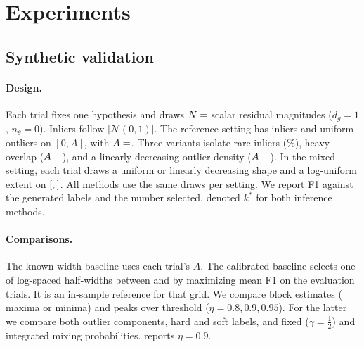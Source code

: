 \documentclass[10pt,twocolumn,letterpaper]{article}
\newcommand{\NN}{\mathcal{N}}               %
\begin{document}
\section{Experiments}
\label{sec:experiments}

\subsection{Synthetic validation}
\label{sec:synthetic}

\paragraph{Design.}
Each trial fixes one hypothesis and draws $N=\syncase{uniform}{N}$
scalar residual magnitudes ($d_g=1$, $n_\theta=0$). Inliers follow
$|\NN(0,1)|$. The reference setting has  inliers
and uniform outliers on $[0,A]$, with $A=\syncase{uniform}{halfwidth}$.
Three variants isolate rare inliers (\%),
heavy overlap ($A=\syncase{uniform_A10}{halfwidth}$), and a linearly
decreasing outlier density ($A=\syncase{linear}{halfwidth}$). In the
mixed setting, each trial draws a uniform or linearly decreasing shape
and a log-uniform extent on
$[\syncase{mixed}{halfwidthmin},\syncase{mixed}{halfwidthmax}]$.
All methods use the same \SynTrials{} draws per setting. We report F1
against the generated labels and the number selected, denoted $k^*$
for both inference methods.

\paragraph{Comparisons.}
The known-width baseline uses each trial's $A$. The calibrated baseline
selects one of \SynGridN{} log-spaced half-widths between \SynGridMin{} and \SynGridMax{}
by maximizing mean F1 on the evaluation trials. It is an in-sample
reference for that grid. We compare block estimates (\SynBlocks{} maxima or
minima) and peaks over threshold ($\eta=0.8,0.9,0.95$). For the latter
we compare both outlier components, hard and soft labels, and fixed
($\gamma=\tfrac12$) and integrated mixing probabilities.
 reports $\eta=0.9$.

\begin{table}[t]
 \centering
 \small
 \caption{Synthetic inlier classification over \SynTrials{} paired trials.
  Each entry gives the number selected (mean $\pm$ standard deviation)
  and mean F1. The true inlier count is , except
  for  in the rare-inlier setting.
  Known and calibrated half-widths use hard labels.
  Tail fits use $\eta=0.9$.}
 \label{tab:synthetic}
 \setlength{\tabcolsep}{3pt}
 \resizebox{\textwidth}{!}{}
\end{table}
\end{document}
